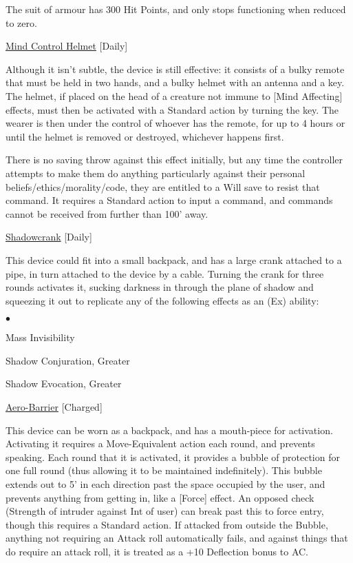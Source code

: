 \smallskip\noindent The suit of armour has 300 Hit Points, and only stops functioning when reduced to zero.

\medskip\noindent\underline{Mind Control Helmet} [Daily] 

\noindent Although it isn't subtle, the device is still effective: it consists of a bulky remote that must be held in two hands, and a bulky helmet with an antenna and a key. The helmet, if placed on the head of a creature not immune to [Mind Affecting] effects, must then be activated with a Standard action by turning the key. The wearer is then under the control of whoever has the remote, for up to 4 hours or until the helmet is removed or destroyed, whichever happens first. 

\smallskip\noindent There is no saving throw against this effect initially, but any time the controller attempts to make them do anything particularly against their personal beliefs/ethics/morality/code, they are entitled to a Will save to resist that command. It requires a Standard action to input a command, and commands cannot be received from further than 100' away. 

\medskip\noindent\underline{Shadowcrank} [Daily] 

\noindent This device could fit into a small backpack, and has a large crank attached to a pipe, in turn attached to the device by a cable. Turning the crank for three rounds activates it, sucking darkness in through the plane of shadow and squeezing it out to replicate any of the following effects as an (Ex) ability: 

\begin{list}{$\bullet$}{\itemspace}
\item Mass Invisibility 
\item Shadow Conjuration, Greater 
\item Shadow Evocation, Greater 
\end{list}

\medskip\noindent\underline{Aero-Barrier} [Charged] 

\noindent This device can be worn as a backpack, and has a mouth-piece for activation. Activating it requires a Move-Equivalent action each round, and prevents speaking. Each round that it is activated, it provides a bubble of protection for one full round (thus allowing it to be maintained indefinitely). This bubble extends out to 5' in each direction past the space occupied by the user, and prevents anything from getting in, like a [Force] effect. An opposed check (Strength of intruder against Int of user) can break past this to force entry, though this requires a Standard action. If attacked from outside the Bubble, anything not requiring an Attack roll automatically fails, and against things that do require an attack roll, it is treated as a +10 Deflection bonus to AC. 

